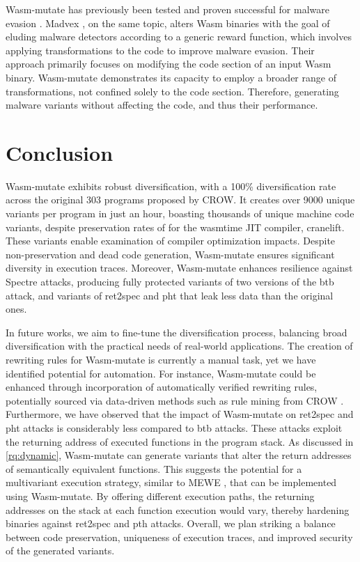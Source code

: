 \documentclass[sigplan,screen]{acmart}
\newcommand{\tool}{Wasm-mutate\xspace}
\begin{document}
\tool has previously been tested and proven successful for malware evasion \cite{CABRERAARTEAGA2023103296}.
Madvex \cite{madvex}, on the same topic, alters Wasm binaries with the goal of eluding malware detectors according to a generic reward function, which involves applying transformations to the code to improve malware evasion. 
Their approach primarily focuses on modifying the code section of an input Wasm binary. 
\tool demonstrates its capacity to employ a broader range of transformations, not confined solely to the code section.
Therefore, generating malware variants without affecting the code, and thus their performance.


\section{Conclusion}
\label{conc}

\tool exhibits robust diversification, with a 100\% diversification rate across the original 303 programs proposed by CROW. 
It creates over 9000 unique variants per program in just an hour, boasting thousands of unique machine code variants, despite preservation rates of \preserved for the wasmtime JIT compiler, cranelift. 
These variants enable examination of compiler optimization impacts.
Despite non-preservation and dead code generation, \tool ensures significant diversity in execution traces. 
Moreover, \tool enhances resilience against Spectre attacks, producing fully protected variants of two versions of the btb attack, and variants of ret2spec and pht that leak less data than the original ones.


In future works, we aim to fine-tune the diversification process, balancing broad diversification with the practical needs of real-world applications. 
The creation of rewriting rules for \tool is currently a manual task, yet we have identified potential for automation. 
For instance, \tool could be enhanced through incorporation of automatically verified rewriting rules, potentially sourced via data-driven methods such as rule mining from CROW \cite{10026577}.
Furthermore, we have observed that the impact of \tool on ret2spec and pht attacks is considerably less compared to btb attacks. 
These attacks exploit the returning address of executed functions in the program stack. 
As discussed in \ref{rq:dynamic}, \tool can generate variants that alter the return addresses of semantically equivalent functions. 
This suggests the potential for a multivariant execution strategy, similar to MEWE \cite{MEWE}, that can be implemented using \tool. 
By offering different execution paths, the returning addresses on the stack at each function execution would vary, thereby hardening binaries against ret2spec and pth attacks.
Overall, we plan striking a balance between code preservation, uniqueness of execution traces, and improved security of the generated variants.




\end{document}
